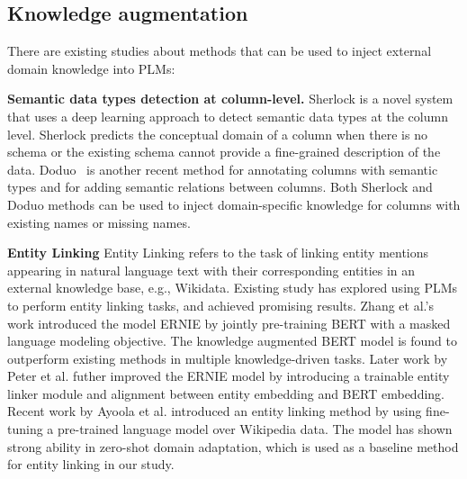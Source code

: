 \subsection{Knowledge augmentation}
There are existing studies about methods that can be used to inject external domain knowledge into PLMs: 


\textbf{Semantic data types detection at column-level.}
Sherlock \cite{hulsebos_sherlock_2019} is a novel system that uses a deep learning approach to detect semantic data types at the column level. Sherlock predicts the conceptual domain of a column when there is no schema or the existing schema cannot provide a fine-grained description of the data. Doduo~\cite{suhara_annotating_2022} is another recent method for annotating  columns with semantic types and for adding semantic relations between columns. Both Sherlock and Doduo methods can be used to inject domain-specific knowledge for columns with existing names or missing names.


\textbf{Entity Linking}
Entity Linking \cite{li_deep_2020} refers to the task of linking entity mentions appearing in natural language text with their corresponding entities in an external knowledge base, e.g., Wikidata. 
Existing study has explored using PLMs to perform entity linking tasks, and achieved promising results. 
Zhang et al.'s work \cite{zhang_ernie_2019} introduced the model ERNIE by jointly pre-training BERT with a masked language modeling objective. The knowledge augmented BERT model is found to outperform existing methods in multiple knowledge-driven tasks. 
Later work by Peter et al. \cite{peters_knowledge_2019} futher improved the ERNIE model by introducing a trainable entity linker module and alignment between entity embedding and BERT embedding. 
Recent work by Ayoola et al. \cite{ayoola_refined_2022} introduced an entity linking method by using fine-tuning a pre-trained language model over Wikipedia data. The model has shown strong ability in zero-shot domain adaptation, which is used as a baseline method for entity linking in our study. 

